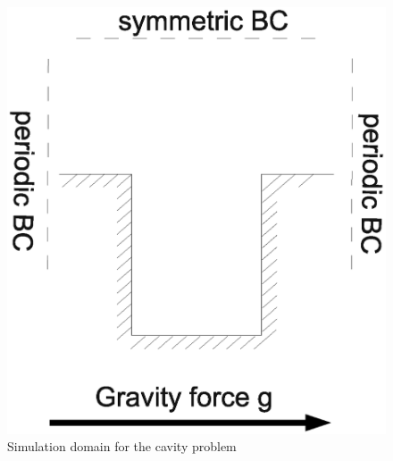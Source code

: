\documentclass[11pt,a4paper,twoside]{report}
\begin{document}
\begin{figure}[!htbp]
  \centering
     \includegraphics[width=1.0\textwidth]{Graphics/SimuSetup/Cavity}
  \caption{Simulation domain for the cavity problem}
  \label{fig:PorositiesCavitiesSimuDomain}
\end{figure}
\end{document}
